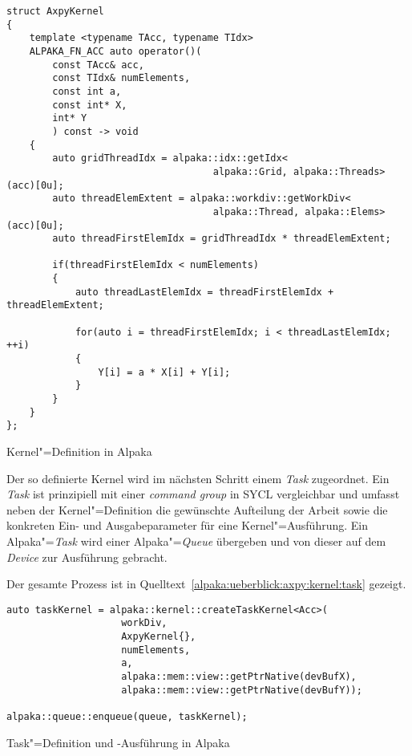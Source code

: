 \begin{code}
    \begin{verbatim}
struct AxpyKernel
{
    template <typename TAcc, typename TIdx>
    ALPAKA_FN_ACC auto operator()(
        const TAcc& acc,
        const TIdx& numElements,
        const int a,
        const int* X,
        int* Y
        ) const -> void
    {
        auto gridThreadIdx = alpaka::idx::getIdx<
                                    alpaka::Grid, alpaka::Threads>(acc)[0u];
        auto threadElemExtent = alpaka::workdiv::getWorkDiv<
                                    alpaka::Thread, alpaka::Elems>(acc)[0u];
        auto threadFirstElemIdx = gridThreadIdx * threadElemExtent;

        if(threadFirstElemIdx < numElements)
        {
            auto threadLastElemIdx = threadFirstElemIdx + threadElemExtent;
            
            for(auto i = threadFirstElemIdx; i < threadLastElemIdx; ++i)
            {
                Y[i] = a * X[i] + Y[i];
            }
        }
    }
};
    \end{verbatim}
    \caption{Kernel"=Definition in Alpaka}
    \label{alpaka:ueberblick:axpy:kernel:kernel_src}
\end{code}

Der so definierte Kernel wird im nächsten Schritt einem \textit{Task}
zugeordnet. Ein \textit{Task} ist prinzipiell mit einer \textit{command group}
in SYCL vergleichbar und umfasst neben der Kernel"=Definition die gewünschte
Aufteilung der Arbeit sowie die konkreten Ein- und Ausgabeparameter für eine
Kernel"=Ausführung. Ein Alpaka"=\textit{Task} wird einer Alpaka"=\textit{Queue}
übergeben und von dieser auf dem \textit{Device} zur Ausführung gebracht.

Der gesamte Prozess ist in Quelltext~\ref{alpaka:ueberblick:axpy:kernel:task}
gezeigt.

\begin{code}
    \begin{verbatim}
auto taskKernel = alpaka::kernel::createTaskKernel<Acc>(
                    workDiv,
                    AxpyKernel{},
                    numElements,
                    a,
                    alpaka::mem::view::getPtrNative(devBufX),
                    alpaka::mem::view::getPtrNative(devBufY));

alpaka::queue::enqueue(queue, taskKernel);
    \end{verbatim}
    \caption{Task"=Definition und -Ausführung in Alpaka}
    \label{alpaka:ueberblick:axpy:kernel:task}
\end{code}

